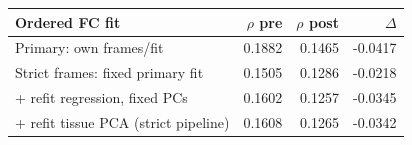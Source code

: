 \begin{tabular}{lrrr}
\toprule
Ordered FC fit & $\rho$ pre & $\rho$ post & $\Delta$ \\
\midrule
Primary: own frames/fit & 0.1882 & 0.1465 & -0.0417 \\
Strict frames: fixed primary fit & 0.1505 & 0.1286 & -0.0218 \\
+ refit regression, fixed PCs & 0.1602 & 0.1257 & -0.0345 \\
+ refit tissue PCA (strict pipeline) & 0.1608 & 0.1265 & -0.0342 \\
\bottomrule
\end{tabular}
